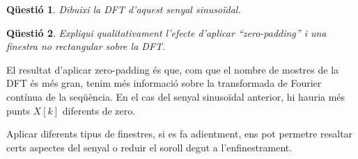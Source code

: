 \documentclass[11pt,a4]{article}
\numberwithin{equation}{section}
\theoremstyle{thmstyle}
\theoremstyle{thmstyle}
\theoremstyle{thmstyle}
\theoremstyle{thmstyle}
\theoremstyle{thmstyle}
\theoremstyle{thmstyle}
\newtheorem{question}{Qüestió}
\begin{document}
\begin{question}
Dibuixi la DFT d'aquest senyal sinusoïdal.
\end{question}

\begin{figure}%
\end{figure}

\begin{question}
Expliqui qualitativament l’efecte d’aplicar “zero-padding” i una finestra no rectangular sobre la DFT.
\end{question}
El resultat d'aplicar zero-padding és que, com que el nombre de mostres de la DFT és més gran, tenim més informació sobre la transformada de Fourier contínua de la seqüència. En el cas del senyal sinusoïdal anterior, hi hauria més punts $X[k]$ diferents de zero.

Aplicar diferents tipus de finestres, si es fa adientment, ens pot permetre resaltar certs aspectes del senyal o reduir el soroll degut a l'enfinestrament.
\end{document}
